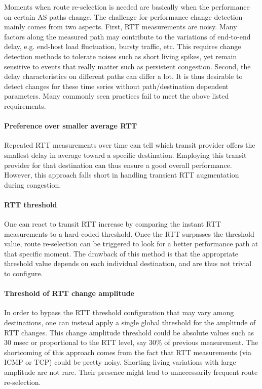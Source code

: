 Moments when route re-selection is needed are basically when the performance on certain AS paths change.
The challenge for performance change detection mainly comes from two aspects.
First, RTT measurements are noisy.
Many factors along the measured path may contribute to the variations of end-to-end delay, e.g. end-host load fluctuation, bursty traffic, etc.
This requires change detection methods to tolerate noises such as short living spikes, yet remain sensitive to events that really matter such as persistent congestion.
Second, the delay characteristics on different paths can differ a lot. 
It is thus desirable to detect changes for these time series without path/destination dependent parameters.
Many commonly seen practices fail to meet the above listed requirements. 

\paragraph{Preference over smaller average RTT} Repeated RTT measurements over time can tell which transit provider offers the smallest delay in average toward a specific destination. 
Employing this transit provider for that destination can thus ensure a good overall performance. 
However, this approach falls short in handling transient RTT augmentation during congestion.

\paragraph{RTT threshold} One can react to transit RTT increase by comparing the instant RTT measurements to a hard-coded threshold. 
Once the RTT surpasses the threshold value, route re-selection can be triggered to look for a better performance path at that specific moment.
The drawback of this method is that the appropriate threshold value depends on each individual destination, and are thus not trivial to configure.

\paragraph{Threshold of RTT change amplitude} In order to bypass the RTT threshold configuration that may vary among destinations, one can instead apply a single global threshold for the amplitude of RTT changes.
This change amplitude threshold could be absolute values such as 30 msec or proportional to the RTT level, say $30\%$ of previous measurement.
The shortcoming of this approach comes from the fact that RTT measurements (via ICMP or TCP) could be pretty noisy.
Shorting living variations with large amplitude are not rare.
Their presence might lead to unnecessarily frequent route re-selection.

